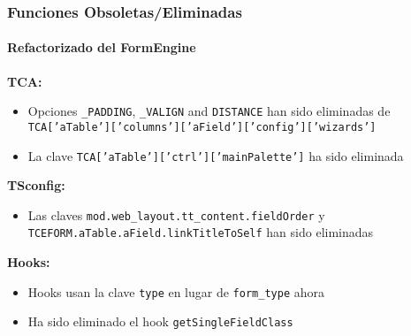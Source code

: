 \begin{frame}[fragile]
	\frametitle{Funciones Obsoletas/Eliminadas}
	\framesubtitle{Refactorizado del FormEngine}

		\textbf{TCA:}

			\small
			\begin{itemize}

				\item Opciones \texttt{\_PADDING}, \texttt{\_VALIGN} and \texttt{DISTANCE}
					han sido eliminadas de
					\texttt{TCA['aTable']['columns']['aField']['config']['wizards']}

				\item La clave \texttt{TCA['aTable']['ctrl']['mainPalette']} ha sido eliminada

			\end{itemize}

		\textbf{TSconfig:}

			\small
			\begin{itemize}
				\item Las claves \texttt{mod.web\_layout.tt\_content.fieldOrder} y
					\texttt{TCEFORM.aTable.aField.linkTitleToSelf} han sido eliminadas
			\end{itemize}

		\textbf{Hooks:}

			\small
			\begin{itemize}
				\item Hooks usan la clave \texttt{type} en lugar de \texttt{form\_type} ahora
				\item Ha sido eliminado el hook \texttt{getSingleFieldClass}
			\end{itemize}

\end{frame}


